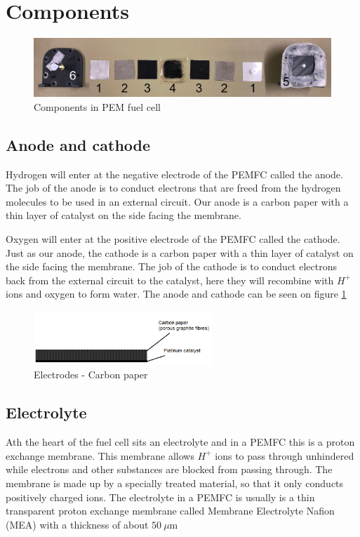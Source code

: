 \section{Components}

\begin{figure}[h]
    \centering
    \includegraphics[width=\textwidth]{DIV./Bilder/layout.jpg}
    \caption{Components in PEM fuel cell}
    \label{fig:Components}
\end{figure}

\subsection{Anode and cathode}
Hydrogen will enter at the negative electrode of the PEMFC called the anode. The job of the anode is to conduct electrons that are freed from the hydrogen molecules to be used in an external circuit. Our anode is a carbon paper with a thin layer of catalyst on the side facing the membrane.

Oxygen will enter at the positive electrode of the PEMFC called the cathode. Just as our anode, the cathode is a carbon paper with a thin layer of catalyst on the side facing the membrane. The job of the cathode is to conduct electrons back from the external circuit to the catalyst, here they will recombine with $H^+$ ions and oxygen to form water. The anode and cathode can be seen on figure \ref{fig:Components}

\begin{figure}[h]
    \centering
    \includegraphics[width=0.6\textwidth]{DIV./Bilder/carbonpaper.png}
    \caption{Electrodes - Carbon paper}
    \label{fig:Electrodes}
\end{figure}

\subsection{Electrolyte}
Ath the heart of the fuel cell sits an electrolyte  and in a PEMFC this is a proton exchange membrane. This membrane allows $H^+$ ions to pass through unhindered while electrons and other substances are blocked from passing through. The membrane is made up by a specially treated material, so that it only conducts positively charged ions. The electrolyte in a  PEMFC is usually is a thin transparent proton exchange membrane called Membrane Electrolyte Nafion (MEA) with a thickness of about \( 50\ \mu \)m


